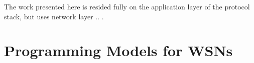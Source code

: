 The work presented here is resided fully on the application layer of the
protocol stack, but uses network layer .. . %






\section {Programming Models for WSNs}


